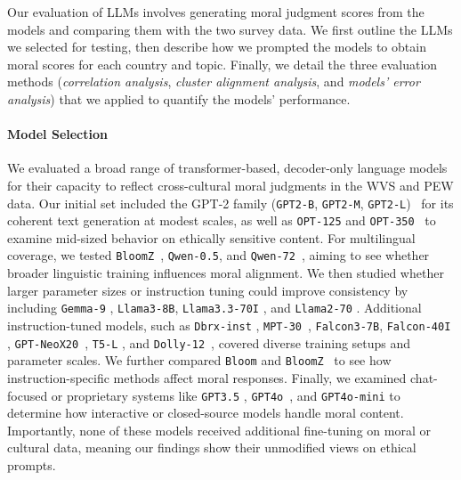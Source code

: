 \documentclass[11pt]{article}
\begin{document}
Our evaluation of LLMs involves generating moral judgment scores from the models and comparing them with the two survey data. We first outline the LLMs we selected for testing, then describe how we prompted the models to obtain moral scores for each country and topic. Finally, we detail the three evaluation methods (\emph{correlation analysis}, \emph{cluster alignment analysis}, and \emph{models’ error analysis}) that we applied to quantify the models’ performance.


\paragraph{Model Selection}
We evaluated a broad range of transformer-based, decoder-only language models for their capacity to reflect cross-cultural moral judgments in the WVS and PEW data. Our initial set included the GPT-2 family (\texttt{GPT2-B}, \texttt{GPT2-M}, \texttt{GPT2-L})~\citep{Radford2019} for its coherent text generation at modest scales, as well as \texttt{OPT-125} and \texttt{OPT-350}~\citep{Zhang2022} to examine mid-sized behavior on ethically sensitive content. For multilingual coverage, we tested \texttt{BloomZ}~\citep{Muennighoff2023}, \texttt{Qwen-0.5}, and \texttt{Qwen-72}~\citep{Bai2023}, aiming to see whether broader linguistic training influences moral alignment. We then studied whether larger parameter sizes or instruction tuning could improve consistency by including \texttt{Gemma-9} \citep{Mesnard2024}, \texttt{Llama3-8B}, \texttt{Llama3.3-70I} \citep{Touvron2023a}, and \texttt{Llama2-70} \citep{Touvron2023b}. Additional instruction-tuned models, such as \texttt{Dbrx-inst} \citep{Conover2023a}, \texttt{MPT-30}~\citep{Mosaicml2023}, \texttt{Falcon3-7B}, \texttt{Falcon-40I} \citep{Almazrouei2023}, \texttt{GPT-NeoX20}~\citep{Black2022}, \texttt{T5-L} \citep{raffel2020exploring}, and \texttt{Dolly-12}~\citep{Conover2023b}, covered diverse training setups and parameter scales. We further compared \texttt{Bloom} \citep{LeScao2022} and \texttt{BloomZ}~\citep{Muennighoff2023} to see how instruction-specific methods affect moral responses. Finally, we examined chat-focused or proprietary systems like \texttt{GPT3.5} \citep{brown2020language}, \texttt{GPT4o}~\citep{OpenAI2024b}, and \texttt{GPT4o-mini} \citep{OpenAI2024a} to determine how interactive or closed-source models handle moral content. Importantly, none of these models received additional fine-tuning on moral or cultural data, meaning our findings show their unmodified views on ethical prompts.
\end{document}
